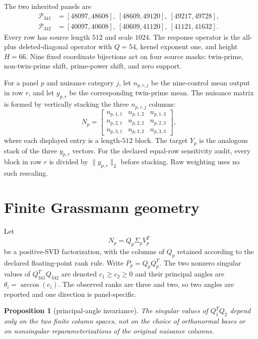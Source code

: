 \documentclass[11pt]{article}
\newtheorem{proposition}{Proposition}
\newcommand{\norm}[1]{\lVert #1\rVert_2}
\begin{document}
The two inherited panels are
\begin{align*}
\mathcal P_{341}
 &= [48097,48608],\ [48609,49120],\ [49217,49728],\\
\mathcal P_{342}
 &= [40097,40608],\ [40609,41120],\ [41121,41632].
\end{align*}
Every row has source length $512$ and scale $1024$.  The response operator is
the all-plus deleted-diagonal operator with $Q=54$, kernel exponent one, and
height $H=66$.  Nine fixed coordinate bijections act on four source masks:
twin-prime, non-twin-prime shift, prime-power shift, and zero support.

For a panel $p$ and nuisance category $j$, let $n_{p,r,j}$ be the
nine-control mean output in row $r$, and let $y_{p,r}$ be the corresponding
twin-prime mean.  The nuisance matrix is formed by vertically stacking the
three $n_{p,r,j}$ columns:
\[
 N_p =
 \begin{bmatrix}
 n_{p,1,1} & n_{p,1,2} & n_{p,1,3}\\
 n_{p,2,1} & n_{p,2,2} & n_{p,2,3}\\
 n_{p,3,1} & n_{p,3,2} & n_{p,3,3}
 \end{bmatrix},
\]
where each displayed entry is a length-$512$ block.  The target $Y_p$ is
the analogous stack of the three $y_{p,r}$ vectors.  For the declared
equal-row sensitivity audit, every block in row $r$ is divided by
$\norm{y_{p,r}}$ before stacking.  Raw weighting uses no such rescaling.

\section{Finite Grassmann geometry}

Let
\[
 N_p=Q_p\Sigma_pV_p^{T}
\]
be a positive-SVD factorization, with the columns of $Q_p$ retained according
to the declared floating-point rank rule.  Write $P_p=Q_pQ_p^T$.  The two
nonzero singular values of $Q_{341}^TQ_{342}$ are denoted $c_1\geq c_2\geq0$
and their principal angles are $\theta_i=\arccos(c_i)$.  The observed ranks
are three and two, so two angles are reported and one direction is
panel-specific.

\begin{proposition}[principal-angle invariance]
\label{prop:angle}
The singular values of $Q_1^TQ_2$ depend only on the two finite column
spaces, not on the choice of orthonormal bases or on nonsingular
reparameterizations of the original nuisance columns.
\end{proposition}
\end{document}
